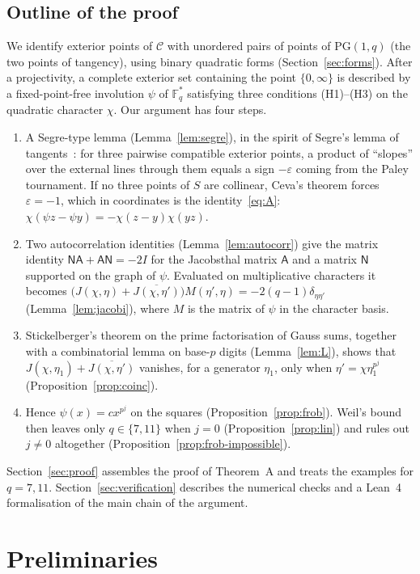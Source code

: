 \documentclass[11pt]{amsart}
\theoremstyle{definition}
\theoremstyle{remark}
\numberwithin{equation}{section}
\newcommand{\Fs}{\mathbb{F}_q^{*}}
\newcommand{\PGone}{\mathrm{PG}(1,q)}
\newcommand{\Con}{\mathcal{C}}
\newcommand{\conj}[1]{\overline{#1}}
\newcommand{\mA}{\mathsf{A}}
\newcommand{\mN}{\mathsf{N}}
\begin{document}
\subsection*{Outline of the proof}
We identify exterior points of $\Con$ with unordered pairs of points of $\PGone$ (the two points of tangency), using binary
quadratic forms (Section~\ref{sec:forms}). After a projectivity, a complete exterior set containing the point $\{0,\infty\}$ is
described by a fixed-point-free involution $\psi$ of $\Fs$ satisfying three conditions (H1)--(H3) on the quadratic character
$\chi$. Our argument has four steps.
\begin{enumerate}
\item A Segre-type lemma (Lemma~\ref{lem:segre}), in the spirit of Segre's lemma of tangents~\cite{Segre55}: for three pairwise
compatible exterior points, a product of ``slopes'' over the external lines through them equals a sign $-\varepsilon$ coming
from the Paley tournament. If no three points of $S$ are collinear, Ceva's theorem forces $\varepsilon=-1$, which in
coordinates is the identity~\eqref{eq:A}: $\chi(\psi z-\psi y)=-\chi(z-y)\chi(yz)$.
\item Two autocorrelation identities (Lemma~\ref{lem:autocorr}) give the matrix identity $\mN\mA+\mA\mN=-2I$ for the Jacobsthal
matrix $\mA$ and a matrix $\mN$ supported on the graph of $\psi$. Evaluated on multiplicative characters it becomes
$\bigl(J(\chi,\eta)+\conj{J(\chi,\eta')}\bigr)M(\eta',\eta)=-2(q-1)\delta_{\eta\eta'}$ (Lemma~\ref{lem:jacobi}), where $M$ is the
matrix of $\psi$ in the character basis.
\item Stickelberger's theorem on the prime factorisation of Gauss sums, together with a combinatorial lemma on base-$p$ digits
(Lemma~\ref{lem:L}), shows that $J(\chi,\eta_1)+\conj{J(\chi,\eta')}$ vanishes, for a generator $\eta_1$, only when
$\eta'=\chi\eta_1^{p^j}$ (Proposition~\ref{prop:coinc}).
\item Hence $\psi(x)=cx^{p^{j}}$ on the squares (Proposition~\ref{prop:frob}). Weil's bound then leaves only $q\in\{7,11\}$ when
$j=0$ (Proposition~\ref{prop:lin}) and rules out $j\ne0$ altogether (Proposition~\ref{prop:frob-impossible}).
\end{enumerate}
Section~\ref{sec:proof} assembles the proof of Theorem~A and treats the examples for $q=7,11$. Section~\ref{sec:verification}
describes the numerical checks and a Lean~4 formalisation of the main chain of the argument.

\section{Preliminaries}\label{sec:prelim}
\end{document}
